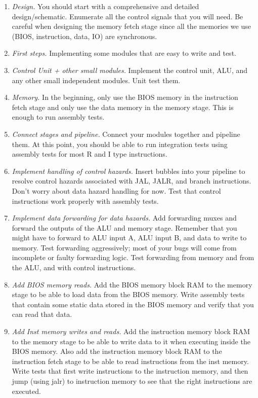 \documentclass[11pt]{article}
\begin{document}
\begin{enumerate}
  \item \textit{Design.} You should start with a comprehensive and detailed design/schematic. Enumerate all the control signals that you will need. Be careful when designing the memory fetch stage since all the memories we use (BIOS, instruction, data, IO) are synchronous.
  \item \textit{First steps.} Implementing some modules that are easy to write and test.
  \item \textit{Control Unit + other small modules.} Implement the control unit, ALU, and any other small independent modules. Unit test them.
  \item \textit{Memory.} In the beginning, only use the BIOS memory in the instruction fetch stage and only use the data memory in the memory stage. This is enough to run assembly tests.
  \item \textit{Connect stages and pipeline.} Connect your modules together and pipeline them. At this point, you should be able to run integration tests using assembly tests for most R and I type instructions.
  \item \textit{Implement handling of control hazards.} Insert bubbles into your pipeline to resolve control hazards associated with JAL, JALR, and branch instructions. Don't worry about data hazard handling for now. Test that control instructions work properly with assembly tests.
  \item \textit{Implement data forwarding for data hazards.} Add forwarding muxes and forward the outputs of the ALU and memory stage. Remember that you might have to forward to ALU input A, ALU input B, and data to write to memory. Test forwarding aggressively; most of your bugs will come from incomplete or faulty forwarding logic. Test forwarding from memory and from the ALU, and with control instructions.
  \item \textit{Add BIOS memory reads.} Add the BIOS memory block RAM to the memory stage to be able to load data from the BIOS memory. Write assembly tests that contain some static data stored in the BIOS memory and verify that you can read that data.
  \item \textit{Add Inst memory writes and reads.} Add the instruction memory block RAM to the memory stage to be able to write data to it when executing inside the BIOS memory. Also add the instruction memory block RAM to the instruction fetch stage to be able to read instructions from the inst memory. Write tests that first write instructions to the instruction memory, and then jump (using jalr) to instruction memory to see that the right instructions are executed.

\end{enumerate}
\end{document}
